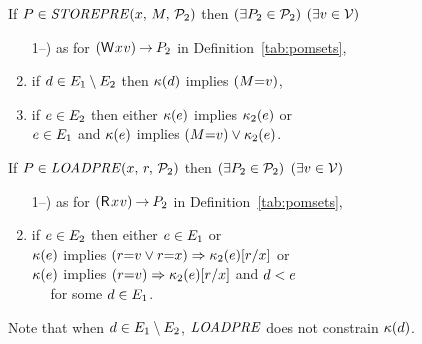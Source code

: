 \begin{definition}
  \noindent
  If $\aPS\SB0 \in \sSTOREPRE{\aLoc}{\aExp}{\aPSS_2}$ then
  $(\exists\aPS_2\in\aPSS_2)$
  $(\exists\aVal\in\Val)$
  \begin{enumerate}
     \setcounter{enumi}{\value{pomsetPrefixOrderCount}}
  \item[1--\thepomsetPrefixOrderCount)] as for $\DWP{\aLoc}{\aVal}\sPREFIX\aPS_2$ in
    Definition~\ref{tab:pomsets}, %
  \item if $\bEv\in\aEvs_1\setminus\aEvs_2$ then $\labelingForm\SB0(\bEv)$ implies $(\aExp{=}\aVal)$,
  \item if $\aEv\in\aEvs_2$ then either
    $\labelingForm\SB0(\aEv)$ implies $\labelingForm_2(\aEv)$ or\\
    $\aEv\in\aEvs_1$ and $\labelingForm\SB0(\aEv)$ implies $(\aExp{=}\aVal)\lor \labelingForm_2(\aEv)$.
  \end{enumerate}

  \noindent
  If $\aPS\SB0 \in \sLOADPRE{\aLoc}{\aReg}{\aPSS_2}$ then
  $(\exists\aPS_2\in\aPSS_2)$
  $(\exists\aVal\in\Val)$
  \begin{enumerate}
     \setcounter{enumi}{\value{pomsetPrefixOrderCount}}
  \item[1--\thepomsetPrefixOrderCount)] as for $\DRP{\aLoc}{\aVal}\sPREFIX\aPS_2$ in
    Definition~\ref{tab:pomsets}, %
  \item if $\aEv\in\aEvs_2$ then either $\aEv\in\aEvs_1$ or\\
    $\labelingForm\SB0(\aEv)$ implies $(\aReg{=}\aVal\lor\aReg{=}\aLoc)\limplies\labelingForm_2(\aEv)[\aReg/\aLoc]$ or\\
    $\labelingForm\SB0(\aEv)$ implies $(\aReg{=}\aVal)\limplies\labelingForm_2(\aEv)[\aReg/\aLoc]$ and $\bEv<\SB0\aEv$ \\
    \mbox{$\quad$} for some $\bEv\in\aEvs_1$.
  \end{enumerate}  
\end{definition}
Note that when $\bEv\in\aEvs_1\setminus\aEvs_2$, $\sLOADPRE{}{}{}$ does not
constrain $\labelingForm\SB0(\bEv)$.

